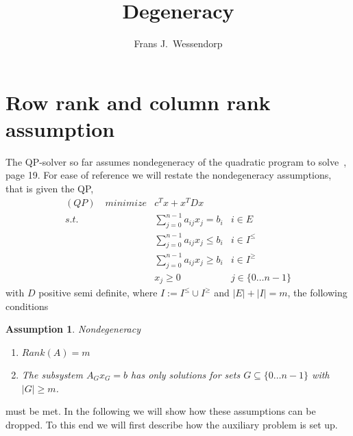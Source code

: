 \documentclass[a4paper]{article}
\title{Degeneracy}
\author{Frans J.\ Wessendorp}
\newtheorem{assumption}{Assumption}
\begin{document}
\maketitle
\section{Row rank and column rank assumption}
The QP-solver so far assumes nondegeneracy of the quadratic program to
solve~\cite{Sven}, page 19. For ease of reference we will restate the
nondegeneracy assumptions, that is given the QP,
\begin{eqnarray}
\label{def:QP}
(QP)\quad minimize&  c^{T}x + x^{T} D x      	&  \nonumber \\
s.t.	 & \sum_{j=0}^{n-1}a_{ij}x_{j} = b_{i}	& i \in E  \nonumber \\
	 & \sum_{j=0}^{n-1}a_{ij}x_{j} \leq b_{i} & i \in I^{\leq} \\
	 & \sum_{j=0}^{n-1}a_{ij}x_{j} \geq b_{i} & i \in I^{\geq}  \nonumber \\
 	 & x_{j} \geq 0				& j \in \{0 \ldots n-1 \}
	 \nonumber
\end{eqnarray}
with $D$ positive semi definite, where $I:= I^{\leq} \cup I^{\geq}$ and
$\left| E \right| + \left| I \right| = m$,
the following conditions
\begin{assumption} \label{ass:nondegeneracy}
Nondegeneracy

\begin{enumerate}
\item $Rank\left( A \right) = m$
\item The subsystem $A_{G}x_{G} = b$ has only solutions for sets $G \subseteq
\{0 \ldots n-1\}$ with $\left|G \right| \geq m$.
\end{enumerate}
\end{assumption}
must be met. In the following we will show how these
assumptions can be dropped. To this end we will first describe how the auxiliary
problem is set up. 
\end{document}
